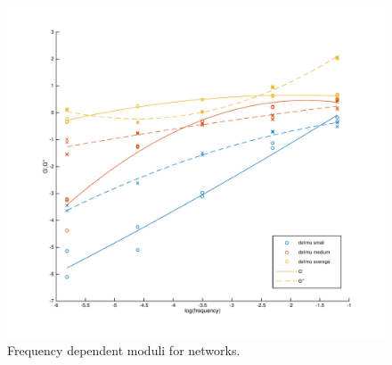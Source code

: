 \begin{figure}[h!]
	\centering
	\includegraphics[width=\hsize]{slippage/frequency_dep}
	\caption{\label{fig:freq} Frequency dependent moduli for networks.}
\end{figure}

